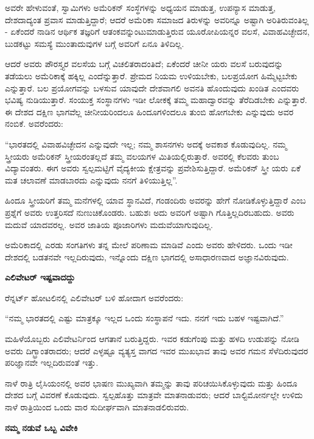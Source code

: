 ಅವರೇ ಹೇಳುವಂತೆ, ಸ್ವಾಮಿಗಳು ಅಮೆರಿಕನ್ ಸಂಸ್ಥೆಗಳನ್ನು ಅಧ್ಯಯನ ಮಾಡುತ್ತ, ಉಪನ್ಯಾಸ ಮಾಡುತ್ತ, ದೇಶದಾದ್ಯಂತ ಪ್ರವಾಸ ಮಾಡುತ್ತಿದ್ದಾರೆ; ಆದರೆ ಅಮೆರಿಕಾ ಸಮಾಜದ ತಿರುಳನ್ನು ಅವರಿನ್ನೂ ಅಷ್ಟಾಗಿ ಅರಿತಿರುವಂತಿಲ್ಲ - ಏಕೆಂದರೆ ನಾಡಿನ ಆರ್ಥಿಕ ತಜ್ಞರಿಗೆ ಆತಂಕವನ್ನುಂಟುಮಾಡುತ್ತಿರುವ ಯೂರೋಪಿಯನ್ನರ ವಲಸೆ, ವಿವಾಹವಿಚ್ಛೇದನ, ಬುಡಕಟ್ಟು ಸಮಸ್ಯೆ ಮುಂತಾದುವುಗಳ ಬಗ್ಗೆ ಅವರಿಗೆ ಏನೂ ತಿಳಿದಿಲ್ಲ.

ಆದರೆ ಅವರು ಪೌರಸ್ತ್ಯರ ವಲಸೆಯ ಬಗ್ಗೆ ವಿಚಲಿತರಾದಂತಿದೆ; ಏಕೆಂದರೆ ಚೀನೀ ಯರು ವಲಸೆ ಬರುವುದನ್ನು ತಡೆಯಲು ಅಮೆರಿಕಾಕ್ಕೆ ಹಕ್ಕಿಲ್ಲ ಎಂದೆನ್ನುತ್ತಾರೆ. ಪ್ರೇಮದ ನಿಯಮ ಉಳಿಯಬೇಕು, ಬಲಪ್ರಯೋಗ ಹಿಮ್ಮೆಟ್ಟಬೇಕು ಎನ್ನುತ್ತಾರೆ. ಬಲ ಪ್ರಯೋಗವನ್ನು ಬಳಸುವ ಯಾವುದೇ ದೇಶವಾಗಲಿ ಅವನತಿ ಹೊಂದುವುದು ಖಂಡಿತ ಎಂದವರು ಭವಿಷ್ಯ ನುಡಿಯುತ್ತಾರೆ. ಸಂಯುಕ್ತ ಸಂಸ್ಥಾನಗಳು ಇಡೀ ಲೋಕಕ್ಕೆ ತಮ್ಮ ಮಹಾದ್ವಾರವನ್ನು ತೆರೆದಿಡಬೇಕು ಎನ್ನುತ್ತಾರೆ. ಈ ದೇಶದ ದಕ್ಷಿಣ ಭಾಗವೆಲ್ಲ ಚೀನೀಯರಿಂದಲೂ ಹಿಂದೂಗಳಿಂದಲೂ ತುಂಬಿ ಹೋಗಬೇಕು ಎನ್ನುವುದು ಅವರ ನಂಬಿಕೆ. ಅವರೆಂದರು:

“ಭಾರತದಲ್ಲಿ ವಿವಾಹವಿಚ್ಛೇದನ ಎನ್ನುವುದೇ ಇಲ್ಲ; ನಮ್ಮ ಶಾಸನಗಳು ಅದಕ್ಕೆ ಅವಕಾಶ ಕೊಡುವುದಿಲ್ಲ. ನಮ್ಮ ಸ್ತ್ರೀಯರು ಅಮೆರಿಕನ್ ಸ್ತ್ರೀಯರಂತಲ್ಲದೆ ತಮ್ಮ ವಲಯಗಳ ಮಿತಿಯಲ್ಲಿರುತ್ತಾರೆ. ಅವರಲ್ಲಿ ಕೆಲವರು ತುಂಬ ವಿದ್ಯಾವಂತರು. ಈಗ ಅವರು ಸ್ವಲ್ಪಮಟ್ಟಿಗೆ ವೈದ್ಯಕೀಯ ಕ್ಷೇತ್ರವನ್ನು ಪ್ರವೇಶಿಸುತ್ತಿದ್ದಾರೆ. ಅಮೆರಿಕನ್ ಸ್ತ್ರೀ ಯರು ಏಕೆ ಮತ ಚಲಾವಣೆ ಮಾಡಬಾರದು ಎನ್ನುವುದು ನನಗೆ ತಿಳಿಯುತ್ತಿಲ್ಲ”.

ಹಿಂದೂ ಸ್ತ್ರೀಯರಿಗೆ ತಮ್ಮ ಮನೆಗಳಲ್ಲಿ ಯಾವ ಸ್ಥಾನವಿದೆ, ಗಂಡಂದಿರು ಅವರನ್ನು ಹೇಗೆ ನೋಡಿಕೊಳ್ಳುತ್ತಿದ್ದಾರೆ ಎಂಬ ಪ್ರಶ್ನೆಗೆ ಅವರು ಉತ್ತರಿಸದೆ ನುಣುಚಿಕೊಂಡರು. ಬಹುಶಃ ಅದು ಅವರಿಗೆ ಅಷ್ಟಾಗಿ ಗೊತ್ತಿಲ್ಲದಿರಬಹುದು. ಅವರು ಮದುವೆ ಯಾದವರಲ್ಲ. ಅವರ ಜಾತಿಯ ಪೂಜಾರಿಗಳು ಮದುವೆಯಾಗುವುದಿಲ್ಲ.

ಅಮೆರಿಕಾದಲ್ಲಿ ಎರಡು ಸಂಗತಿಗಳು ತನ್ನ ಮೇಲೆ ಪರಿಣಾಮ ಮಾಡಿವೆ ಎಂದು ಅವರು ಹೇಳಿದರು. ಒಂದು ಇಡೀ ದೇಶದಲ್ಲಿ ಬಡತನವೇ ಇಲ್ಲದಿರುವುದು, ಇನ್ನೊಂದು ದಕ್ಷಿಣ ಭಾಗದಲ್ಲಿ ಅಸಾಧಾರಣವಾದ ಅಜ್ಞಾನವಿರುವುದು.

\begin{center}
\textbf{ಎಲಿವೇಟರ್ ಇಷ್ಟವಾದದ್ದು}
\end{center}

ರೆನ್ನರ್ಟ್ ಹೋಟಲಿನಲ್ಲಿ ಎಲಿವೇಟರ್ ಬಳಿ ಹೋದಾಗ ಅವರೆಂದರು:

“ನಮ್ಮ ಭಾರತದಲ್ಲಿ ಎಷ್ಟು ಮಾತ್ರಕ್ಕೂ ಇಲ್ಲದ ಒಂದು ಸಂಸ್ಥಾಪನೆ ಇದು. ನನಗೆ ಇದು ಬಹಳ ಇಷ್ಟವಾಗಿದೆ.”

ಮಹಿಳೆಯೊಬ್ಬರು ಎಲಿವೇಟರ್ನಿಂದ ಆಗತಾನೆ ಬರುತ್ತಿದ್ದರು. ಇವರ ಕಡುಗೆಂಪು ಮತ್ತು ಹಳದಿ ಉಡುಪನ್ನು ನೋಡಿ ಅವರು ದಿಗ್ಭ್ರಾಂತರಾದರು; ಆದರೆ ಎಳ್ಳಷ್ಟೂ ವ್ಯತ್ಯಸ್ತ ವಾಗದ ಇವರ ಮುಖಭಾವ ತಾವು ಅವರ ಗಮನ ಸೆಳೆದಿರುವುದರ ಪರಿಜ್ಞಾನವೇ ಇಲ್ಲದಿರುವಂತೆ ಇತ್ತು.

ನಾಳೆ ರಾತ್ರಿ ಲೈಸಿಯಂನಲ್ಲಿ ಅವರ ಭಾಷಣ ಮುಖ್ಯವಾಗಿ ತಮ್ಮನ್ನು ತಾವು ಪರಿಚಯಿಸಿಕೊಳ್ಳುವುದು ಮತ್ತು ಹಿಂದೂ ದೇಶದ ಬಗ್ಗೆ ವಿವರಣೆ ಕೊಡುವುದು. ಸ್ವಲ್ಪಹೊತ್ತು ಮಾತ್ರವೇ ಮಾತನಾಡುವರು; ಆದರೆ ಬಾಲ್ಟಿಮೋರ್ನಲ್ಲೇ ಉಳಿದು ನಾಳೆ ರಾತ್ರಿಯಿಂದ ಒಂದು ವಾರ ಸುದೀರ್ಘವಾಗಿ ಮಾತನಾಡಲಿರುವರು.

\begin{center}
\textbf{ನಮ್ಮ ನಡುವೆ ಒಬ್ಬ ವಿವೇಕಿ}
\end{center}

